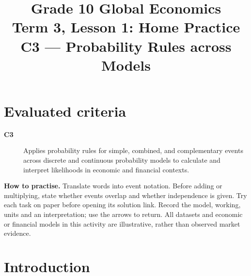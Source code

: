 \makeatletter
{}
\makeatother




\title{Grade 10 Global Economics\\Term 3, Lesson 1: Home Practice\\C3 --- Probability Rules across Models}
\author{}
\date{}

\maketitle
\setcounter{tocdepth}{1}
\setcounter{secnumdepth}{2}
\label{toc}
\tableofcontents
\section*{Evaluated criteria}
\begin{description}
\item[\textbf{C3}] Applies probability rules for simple, combined, and complementary events across discrete and continuous probability models to calculate and interpret likelihoods in economic and financial contexts.
\end{description}
\textbf{How to practise.} Translate words into event notation. Before adding or multiplying, state whether events overlap and whether independence is given. Try each task on paper before opening its solution link. Record the model, working, units and an interpretation; use the arrows to return.
All datasets and economic or financial models in this activity are illustrative, rather than observed market evidence.

\clearpage
\section{Introduction}\label{sec:introduction}

